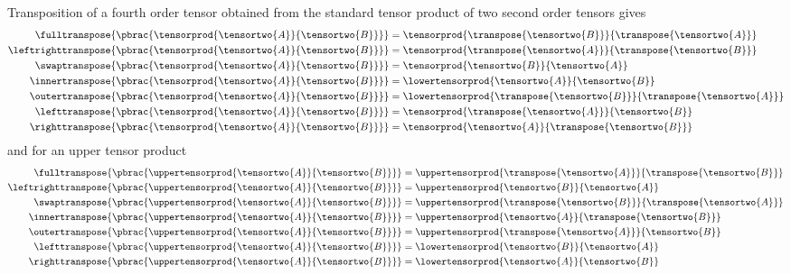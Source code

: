 Transposition of a fourth order tensor obtained from the standard tensor
product of two second order tensors gives
\begin{align}
  \fulltranspose{\pbrac{\tensorprod{\tensortwo{A}}{\tensortwo{B}}}}&=\tensorprod{\transpose{\tensortwo{B}}}{\transpose{\tensortwo{A}}}\\
  \leftrighttranspose{\pbrac{\tensorprod{\tensortwo{A}}{\tensortwo{B}}}}&=\tensorprod{\transpose{\tensortwo{A}}}{\transpose{\tensortwo{B}}}\\
  \swaptranspose{\pbrac{\tensorprod{\tensortwo{A}}{\tensortwo{B}}}}&=\tensorprod{\tensortwo{B}}{\tensortwo{A}}\\
  \innertranspose{\pbrac{\tensorprod{\tensortwo{A}}{\tensortwo{B}}}}&=\lowertensorprod{\tensortwo{A}}{\tensortwo{B}}\\
  \outertranspose{\pbrac{\tensorprod{\tensortwo{A}}{\tensortwo{B}}}}&=\lowertensorprod{\transpose{\tensortwo{B}}}{\transpose{\tensortwo{A}}}\\
  \lefttranspose{\pbrac{\tensorprod{\tensortwo{A}}{\tensortwo{B}}}}&=\tensorprod{\transpose{\tensortwo{A}}}{\tensortwo{B}}\\
  \righttranspose{\pbrac{\tensorprod{\tensortwo{A}}{\tensortwo{B}}}}&=\tensorprod{\tensortwo{A}}{\transpose{\tensortwo{B}}}
\end{align}
and for an upper tensor product
\begin{align}
  \fulltranspose{\pbrac{\uppertensorprod{\tensortwo{A}}{\tensortwo{B}}}}&=\uppertensorprod{\transpose{\tensortwo{A}}}{\transpose{\tensortwo{B}}}\\
  \leftrighttranspose{\pbrac{\uppertensorprod{\tensortwo{A}}{\tensortwo{B}}}}&=\uppertensorprod{\tensortwo{B}}{\tensortwo{A}}\\
  \swaptranspose{\pbrac{\uppertensorprod{\tensortwo{A}}{\tensortwo{B}}}}&=\uppertensorprod{\transpose{\tensortwo{B}}}{\transpose{\tensortwo{A}}}\\
  \innertranspose{\pbrac{\uppertensorprod{\tensortwo{A}}{\tensortwo{B}}}}&=\uppertensorprod{\tensortwo{A}}{\transpose{\tensortwo{B}}}\\
  \outertranspose{\pbrac{\uppertensorprod{\tensortwo{A}}{\tensortwo{B}}}}&=\uppertensorprod{\transpose{\tensortwo{A}}}{\tensortwo{B}}\\
  \lefttranspose{\pbrac{\uppertensorprod{\tensortwo{A}}{\tensortwo{B}}}}&=\lowertensorprod{\tensortwo{B}}{\tensortwo{A}}\\
  \righttranspose{\pbrac{\uppertensorprod{\tensortwo{A}}{\tensortwo{B}}}}&=\lowertensorprod{\tensortwo{A}}{\tensortwo{B}}
\end{align}
